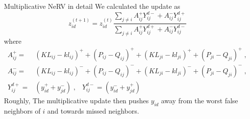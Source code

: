 \documentclass[first=dgreen,second=purple,logo=yellowexc]{aaltoslides}
\begin{document}
\begin{frame}{Multiplicative NeRV in detail}
We calculated the update as
\[
z_{id}^{(t+1)}=z_{id}^{(t)} \frac{\sum_{j\ne i}A_{ij}^+Y^{d-}_{ij}+A_{ij}^-Y^{d+}_{ij}}{\sum_{j\ne i}A_{ij}^+Y^{d+}_{ij}+A^-_{ij}Y^{d-}_{ij}}
\]
where
\begin{align*}
A_{ij}^+=&(KL_{ij}-kl_{ij})^++(P_{ij}-Q_{ij})^+ +(KL_{ji}-kl_{ji})^++(P_{ji}-Q_{ji})^+ \;,\\
A_{ij}^-=&(KL_{ij}-kl_{ij})^-+(P_{ij}-Q_{ij})^- +(KL_{ji}-kl_{ji})^-+(P_{ji}-Q_{ji})^- \;,\\
Y^{d+}_{ij}=&\left(y_{id}^++y_{jd}^-\right)\;,\;\;\;
Y^{d-}_{ij}=\left(y_{id}^-+y_{jd}^+\right)
\end{align*}
Roughly, The multiplicative update then pushes $y_{id}$ away from the worst false neighbors of $i$ and towards missed neighbors.
\end{frame}
\end{document}
